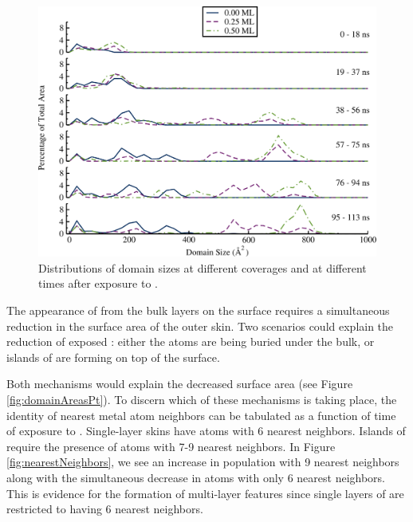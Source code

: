 \begin{figure}[p!]
\includegraphics[width=\linewidth]{../figures/chap3/domains_Pd_110ns.pdf}
\caption{Distributions of  domain sizes at different 
  coverages and at different times after exposure to .}
\label{fig:domainAreasPd} 
\end{figure}

The appearance of  from the bulk layers on the surface requires
a simultaneous reduction in the surface area of the outer 
skin. Two scenarios could explain the reduction of exposed :
either the  atoms are being buried under the  bulk, or
islands of  are forming on top of the  surface.

Both mechanisms would explain the decreased  surface area (see
Figure \ref{fig:domainAreasPt}).  To discern which of these mechanisms
is taking place, the identity of nearest metal atom neighbors can be
tabulated as a function of time of exposure to . Single-layer
 skins have atoms with 6  nearest neighbors. Islands of
 require the presence of  atoms with 7-9  nearest
neighbors. In Figure \ref{fig:nearestNeighbors}, we see an increase in
 population with 9  nearest neighbors along with the
simultaneous decrease in  atoms with only 6  nearest
neighbors.  This is evidence for the formation of multi-layer 
features since single layers of  are restricted to having 6
 nearest neighbors.

